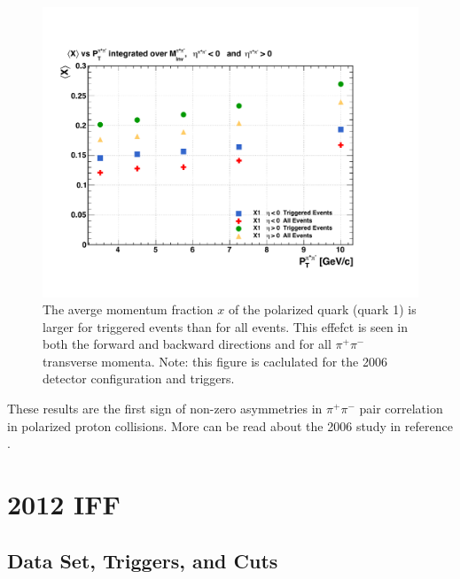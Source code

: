 \documentclass[letterpaper, abstract = on,listof=totoc, bibliography=totoc]{scrreprt}
\newcommand{\pip}{\pi^+}
\newcommand{\pim}{\pi^-}
\newcommand{\pair}{$\pip\pim$ }
\begin{document}
\begin{figure}
\begin{center}
\includegraphics[width = 1\textwidth]{TriggerBiasXHiQualColor}
\caption[Trigger bias toward higher momentum fraction $x$ events]{The averge momentum fraction $x$ of the polarized quark (quark 1) is larger for triggered events than for all events. This effefct is seen in both the forward and backward directions and for all \pair transverse momenta. Note: this figure is caclulated for the 2006 detector configuration and triggers.}
\label{fig:TriggerBiasXHiQualColor}
\end{center}
\end{figure}



These results are the first sign of non-zero asymmetries in \pair pair correlation in polarized proton collisions. More can be read about the 2006 study in reference \cite{2006Paper}.

\chapter{2012 IFF}

\section{Data Set, Triggers, and Cuts}
\end{document}
